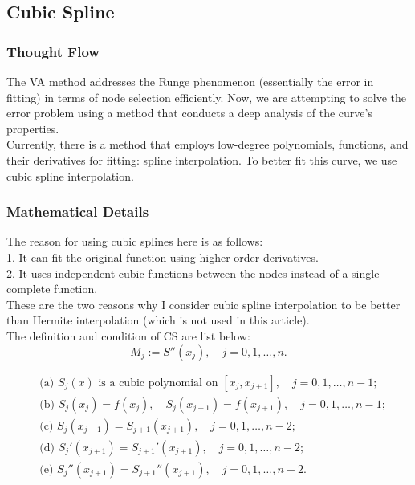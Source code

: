 \documentclass[11pt]{article}
\begin{document}
\subsection{Cubic Spline}
\subsubsection{Thought Flow}
The VA method addresses the Runge phenomenon (essentially the error in fitting) in terms of node selection efficiently. 
Now, we are attempting to solve the error problem using a method that conducts a deep analysis of the curve's properties. \\
Currently, there is a method that employs low-degree polynomials, functions, and their derivatives for fitting: spline interpolation. 
To better fit this curve, we use cubic spline interpolation.

\subsubsection{Mathematical Details}
The reason for using cubic splines here is as follows: \\
1. It can fit the original function using higher-order derivatives. \\
2. It uses independent cubic functions between the nodes instead of a single complete function. \\
These are the two reasons why I consider cubic spline interpolation to be better than Hermite interpolation (which is not used in this article).\\
The definition and condition of CS are list below:
\[
  M_j := S''(x_j),\quad j=0,1,\dots,n.
\]

\begin{subequations}\label{eq:spline-conds}
\begin{align}
  &\text{(a) }S_j(x)\text{ is a cubic polynomial on }[x_j,x_{j+1}],\quad j=0,1,\dots,n-1;\\
  &\text{(b) }S_j(x_j)=f(x_j),\quad S_j(x_{j+1})=f(x_{j+1}),\quad j=0,1,\dots,n-1;\\
  &\text{(c) }S_j(x_{j+1})=S_{j+1}(x_{j+1}),\quad j=0,1,\dots,n-2;\\
  &\text{(d) }S_j'(x_{j+1})=S_{j+1}'(x_{j+1}),\quad j=0,1,\dots,n-2;\\
  &\text{(e) }S_j''(x_{j+1})=S_{j+1}''(x_{j+1}),\quad j=0,1,\dots,n-2.
\end{align}
\end{subequations}
\end{document}
